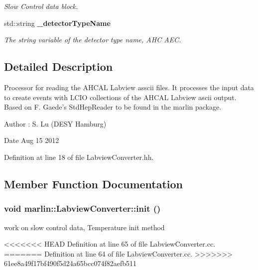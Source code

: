 \begin{DoxyCompactItemize}
\begin{DoxyCompactList}\small\item\em Slow Control data block. \item\end{DoxyCompactList}\item 
std::string {\bf \_\-detectorTypeName}\label{classmarlin_1_1LabviewConverter_a83fa755238559bb5051226ccaaf476a8}

\begin{DoxyCompactList}\small\item\em The string variable of the detector type name, AHC AEC. \item\end{DoxyCompactList}\end{DoxyCompactItemize}


\subsection{Detailed Description}
Processor for reading the AHCAL Labview asscii files. It processes the input data to create events with LCIO collections of the AHCAL Labview ascii output. Based on F. Gaede's StdHepReader to be found in the marlin package. \begin{DoxyAuthor}{Author}
: S. Lu (DESY Hamburg) 
\end{DoxyAuthor}
\begin{DoxyDate}{Date}
Aug 15 2012 
\end{DoxyDate}


Definition at line 18 of file LabviewConverter.hh.

\subsection{Member Function Documentation}
\subsubsection[{init}]{\setlength{\rightskip}{0pt plus 5cm}void marlin::LabviewConverter::init ()\hspace{0.3cm}{\ttfamily  [virtual]}}\label{classmarlin_1_1LabviewConverter_a537a93a94e2ac7ca4f7a7aa1fd9dbb56}


work on slow control data, Temperature init method 

<<<<<<< HEAD
Definition at line 65 of file LabviewConverter.cc.
=======
Definition at line 64 of file LabviewConverter.cc.
>>>>>>> 61ee8a49f17bf490f5d24a65bcc074f82aefb511

